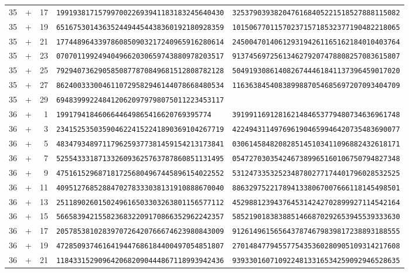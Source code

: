 \begin{longtable}{@{}rcrll@{}}
35&+&17&\texttt{1991938171579970022693941183183245640430}&\texttt{3253790393820476168405221518527888115082}\\
35&+&19&\texttt{6516753014363524494454438360192180928359}&\texttt{1015067701157023715718532377190482218065}\\
35&+&21&\texttt{1774489643397860850903217240965916280614}&\texttt{2450047014061293194261165162184010403764}\\
35&+&23&\texttt{0707011992494049662030659743880978203517}&\texttt{9137456972561346279207478808257083615807}\\
35&+&25&\texttt{7929407362905850877870849681512808782128}&\texttt{5049193086140826744461841137396459017020}\\
35&+&27&\texttt{8624003330046110729582946144078668480534}&\texttt{1163638454083899887054685697207093404709}\\
35&+&29&\texttt{6948399922484120620979798075011223453117}&\texttt{}\\
36&+&1&\texttt{1991794184606644649865416620769395774}&\texttt{3919911691281621484653779480734636961748}\\
36&+&3&\texttt{2341525350359046224152241890369104267719}&\texttt{4224943114976961904659946420735483690077}\\
36&+&5&\texttt{4834793489711796259377381459154213173841}&\texttt{0306145848208285145103411096882432618171}\\
36&+&7&\texttt{5255433318713326093625763787860851131495}&\texttt{0547270303542467389965160106750794827348}\\
36&+&9&\texttt{4751615296871817256804967445896154022552}&\texttt{5312473353252348780277174401796028532525}\\
36&+&11&\texttt{4095127685288470278333038131910888670040}&\texttt{8863297522178941338067007666118145498501}\\
36&+&13&\texttt{2511890260150249616503303263801156577112}&\texttt{4529881239437645314242702899927114542164}\\
36&+&15&\texttt{5665839421558236832209170866352962242357}&\texttt{5852190183838851466870292653945539333630}\\
36&+&17&\texttt{2057853810283970726420766674623980843009}&\texttt{9126149615656437874679839817238893188555}\\
36&+&19&\texttt{4728509374616419447686184400497054851807}&\texttt{2701484779455775435360280905109314217608}\\
36&+&21&\texttt{1184331529096420682090444867118993942436}&\texttt{9393301607109224813316534259092946528635}\\

\end{longtable}
